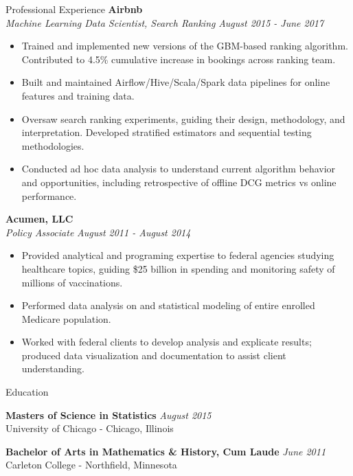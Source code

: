 \documentclass{resume} %
\begin{document}
\begin{rSection}{Professional Experience}
{\bf Airbnb} \\
{\em Machine Learning Data Scientist, Search Ranking} \hfill {\em August 2015 - June 2017} \vspace{0.1em} 
\vspace{-0.2em}
\begin{itemize} \itemsep -0.2em
    \item Trained and implemented new versions of the GBM-based ranking algorithm. Contributed to 4.5\% cumulative increase in bookings across ranking team.
    \item Built and maintained Airflow/Hive/Scala/Spark data pipelines for online features and training data.
    \item Oversaw search ranking experiments, guiding their design, methodology, and interpretation. Developed stratified estimators and sequential testing methodologies.
    \item Conducted ad hoc data analysis to understand current algorithm behavior and opportunities, including retrospective of offline DCG metrics vs online performance.
\end{itemize}


{\bf Acumen, LLC} \\
{\em Policy Associate} \hfill {\em August 2011 - August 2014} \vspace{0.1em} 
\begin{itemize} \itemsep -0.2em
    \item Provided analytical and programing expertise to federal agencies studying healthcare  topics, guiding \$25 billion in spending and monitoring safety of millions of vaccinations.
    \item Performed data analysis on and statistical modeling of entire enrolled Medicare population.
    \item Worked with federal clients to develop analysis and explicate results; produced data visualization and documentation to assist client understanding. 
\end{itemize}
\end{rSection}

\vspace{0.4em}

\begin{rSection}{Education}

    {\bf Masters of Science in Statistics} \hfill {\em August 2015} \\
    University of Chicago - Chicago, Illinois \\
    \vspace{-1.2em}

    {\bf Bachelor of Arts in Mathematics \& History, Cum Laude} \hfill {\em June 2011} \\ 
    Carleton College - Northfield, Minnesota  \\
\end{rSection}
\end{document}
